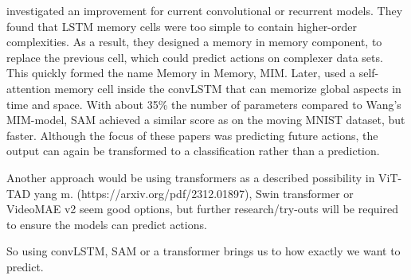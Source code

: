 \textcite{Wang_2019} investigated an improvement for current convolutional or recurrent models. They found that LSTM memory cells were too simple to contain higher-order complexities. As a result, they designed a memory in memory component, to replace the previous cell, which could predict actions on complexer data sets. This quickly formed the name Memory in Memory, MIM. Later, \textcite{Lin_2020} used
a self-attention memory cell inside the convLSTM that can memorize global aspects in time and space. With about 35\% the number of parameters compared to Wang's MIM-model, SAM achieved a similar score as on the moving MNIST dataset, but faster. Although the focus of these papers was predicting future actions, the output can again be transformed to a classification rather than a prediction.

Another approach would be using transformers as a described possibility in %
ViT-TAD yang m. (https://arxiv.org/pdf/2312.01897), Swin transformer or VideoMAE v2 seem good options, but further research/try-outs will be required to ensure the models can predict actions.

So using convLSTM, SAM or a transformer brings us to how exactly we want to predict.






